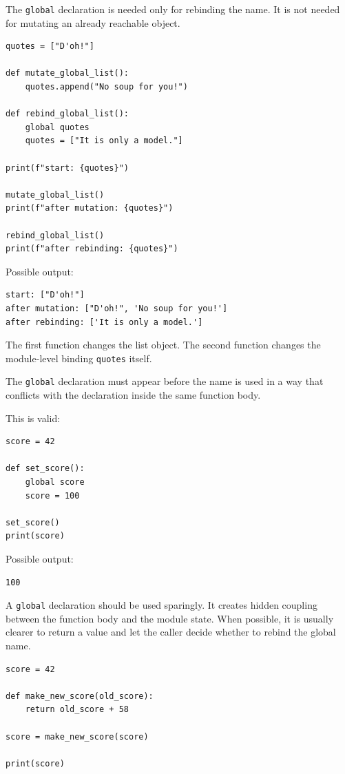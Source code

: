 The \texttt{global} declaration is needed only for rebinding the name. It is not needed for mutating an already reachable object.

\begin{verbatim}
quotes = ["D'oh!"]

def mutate_global_list():
    quotes.append("No soup for you!")

def rebind_global_list():
    global quotes
    quotes = ["It is only a model."]

print(f"start: {quotes}")

mutate_global_list()
print(f"after mutation: {quotes}")

rebind_global_list()
print(f"after rebinding: {quotes}")
\end{verbatim}

Possible output:

\begin{verbatim}
start: ["D'oh!"]
after mutation: ["D'oh!", 'No soup for you!']
after rebinding: ['It is only a model.']
\end{verbatim}

The first function changes the list object. The second function changes the module-level binding \texttt{quotes} itself.

The \texttt{global} declaration must appear before the name is used in a way that conflicts with the declaration inside the same function body.

This is valid:

\begin{verbatim}
score = 42

def set_score():
    global score
    score = 100

set_score()
print(score)
\end{verbatim}

Possible output:

\begin{verbatim}
100
\end{verbatim}

A \texttt{global} declaration should be used sparingly. It creates hidden coupling between the function body and the module state. When possible, it is usually clearer to return a value and let the caller decide whether to rebind the global name.

\begin{verbatim}
score = 42

def make_new_score(old_score):
    return old_score + 58

score = make_new_score(score)

print(score)
\end{verbatim}

